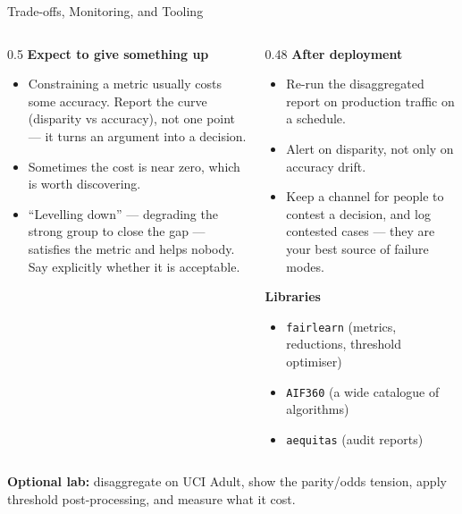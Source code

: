 
\begin{frame}{Trade-offs, Monitoring, and Tooling}

    \begin{columns}[T]
        \begin{column}{0.5\textwidth}
            \textbf{Expect to give something up}
            \begin{itemize}\small
                \setlength\itemsep{0.3em}
                \item Constraining a metric usually costs some accuracy. Report the curve
                      (disparity vs accuracy), not one point --- it turns an argument into a
                      decision.
                \item Sometimes the cost is near zero, which is worth discovering.
                \item ``Levelling down'' --- degrading the strong group to close the gap ---
                      satisfies the metric and helps nobody. Say explicitly whether it is acceptable.
            \end{itemize}
        \end{column}
        \begin{column}{0.48\textwidth}
            \textbf{After deployment}
            \begin{itemize}\small
                \setlength\itemsep{0.3em}
                \item Re-run the disaggregated report on production traffic on a schedule.
                \item Alert on disparity, not only on accuracy drift.
                \item Keep a channel for people to contest a decision, and log contested cases ---
                      they are your best source of failure modes.
            \end{itemize}
            \vspace{0.5em}
            \textbf{Libraries}
            \begin{itemize}\small
                \item \texttt{fairlearn} (metrics, reductions, threshold optimiser)
                \item \texttt{AIF360} (a wide catalogue of algorithms)
                \item \texttt{aequitas} (audit reports)
            \end{itemize}
        \end{column}
    \end{columns}

    \vspace{0.7em}
    \begin{block}{}
        \centering
        \small \textbf{Optional lab:} disaggregate on UCI Adult, show the parity/odds tension, apply
        threshold post-processing, and measure what it cost.
    \end{block}
\end{frame}
